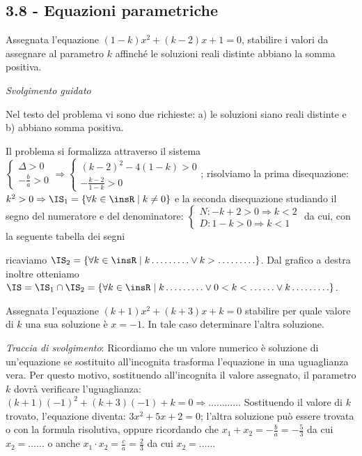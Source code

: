 \subsection*{3.8 - Equazioni parametriche}
\begin{esercizio}
 \label{ese:3.91}
Assegnata l'equazione $(1-k) x^{2} + (k-2) x + 1 = 0$, stabilire i valori da assegnare al parametro $k$ affinché le soluzioni reali distinte abbiano la somma positiva.

\emph{Svolgimento guidato}

Nel testo del problema vi sono due richieste: a) le soluzioni siano reali distinte e b) abbiano somma positiva.

Il problema si formalizza attraverso il sistema
$\left\{\begin{array}{l} \Delta > 0 \\- \frac{b}{a} > 0 \end{array}\right.
\Rightarrow \left \{\begin{array}{l} (k-2)^{2}-4 (1-k) > 0 \\-\frac{k-2}{1-k} > 0 \end{array}\right.$; risolviamo la prima disequazione: $k^{2} > 0 \Rightarrow \IS_{1} = \{\forall k \in \insR \mid k \neq 0 \}$ e la seconda disequazione studiando il segno del numeratore e del denominatore:
$\left\{\begin{array}{l} N: -k + 2 > 0 \Rightarrow k < 2 \\
D: 1-k > 0 \Rightarrow k < 1 \end{array}\right.$ da cui, con la seguente tabella dei segni
\begin{center}

\end{center}
ricaviamo $\IS_{2} = \{\forall k \in \insR \mid k \ldots \ldots \ldots \vee k > \ldots \ldots \ldots \}$.
Dal grafico a destra inoltre otteniamo $\IS = \IS_{1} \cap \IS_{2} = \{\forall k \in \insR \mid k
\ldots \ldots \ldots \vee 0 < k < \ldots \ldots \vee k \ldots \ldots \ldots \}$.
\end{esercizio}

\begin{esercizio}
 \label{ese:3.92}
Assegnata l'equazione $(k + 1) x^{2} + (k + 3) x + k = 0$ stabilire per quale valore di $k$ una sua soluzione è $x =-1$. In tale caso determinare l'altra soluzione.

\emph{Traccia di svolgimento}:
Ricordiamo che un valore numerico è soluzione di un'equazione se sostituito all'incognita trasforma l'equazione in una uguaglianza vera.
Per questo motivo, sostituendo all'incognita il valore assegnato, il parametro $k$ dovrà verificare l'uguaglianza: $(k + 1) (- 1)^{2} + (k + 3) (- 1) + k = 0 \Rightarrow\ldots\ldots\ldots\ldots$
Sostituendo il valore di $k$ trovato, l'equazione diventa: $3 x^{2} + 5 x + 2 = 0$; l'altra soluzione può essere trovata o con la formula risolutiva, oppure
ricordando che $x_{1} + x_{2}=- \frac{b}{a}=- \frac{5}{3}$ da cui $x_{2}=\ldots\ldots$ o anche $x_{1} \cdot x_{2}=\frac{c}{a}=\frac{2}{3}$ da cui $x_{2}=\ldots\ldots$
\end{esercizio}

